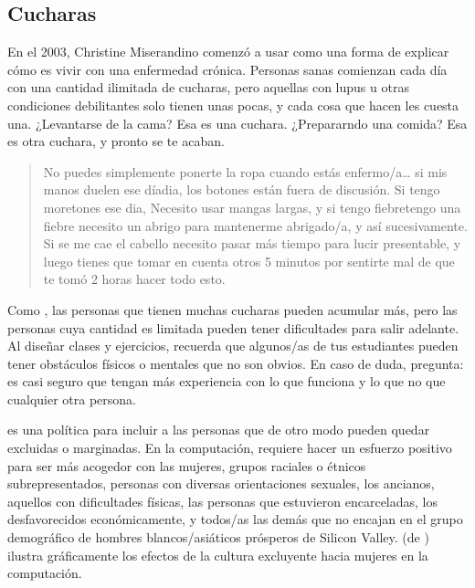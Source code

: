 \subsection*{Cucharas}

En el 2003,
Christine Miserandino comenzó a usar 
como una forma de explicar cómo es vivir con una enfermedad crónica.
Personas sanas comienzan cada día con una cantidad ilimitada de cucharas,
pero aquellas con lupus u otras condiciones debilitantes solo tienen unas pocas,
y cada cosa que hacen les cuesta una.
¿Levantarse de la cama?
Esa es una cuchara.
¿Prepararndo una comida?
Esa es otra cuchara, y pronto se te acaban.

\begin{quote}

  No puedes simplemente ponerte la ropa cuando estás enfermo/a{\dots}
  si mis manos duelen ese díadia, los botones están fuera de discusión.
  Si tengo moretones ese dia,
  Necesito usar mangas largas,
  y si tengo fiebretengo una fiebre necesito un abrigo para mantenerme abrigado/a, y así sucesivamente.
  Si se me cae el cabello necesito pasar más tiempo para lucir presentable,
  y luego tienes que tomar en cuenta otros 5 minutos por sentirte mal
  de que te tomó 2 horas hacer todo esto.

\end{quote}

Como ,
las personas que tienen muchas cucharas pueden acumular más,
pero las personas cuya cantidad es limitada pueden tener dificultades para salir adelante.
Al diseñar clases y ejercicios,
recuerda que algunos/as de tus estudiantes pueden tener obstáculos físicos o mentales que no son obvios.
En caso de duda, pregunta:
es casi seguro que tengan más experiencia con lo que funciona y lo que no que cualquier otra persona.


 es una política para
incluir a las personas que de otro modo pueden quedar excluidas o marginadas.
En la computación,
requiere hacer un esfuerzo positivo para ser más acogedor con las mujeres,
grupos raciales o étnicos subrepresentados,
personas con diversas orientaciones sexuales,
los ancianos,
aquellos con dificultades físicas,
las personas que estuvieron encarceladas,
los desfavorecidos económicamente,
y todos/as las demás que no encajan en el grupo demográfico de hombres blancos/asiáticos prósperos de Silicon Valley.
 (de )
ilustra gráficamente los efectos de la cultura excluyente hacia mujeres en la computación.

